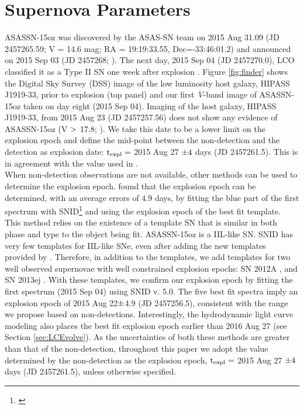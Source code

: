 \documentclass[a4paper,fleqn,usenatbib]{mnras}
\begin{document}
\section{Supernova Parameters} \label{15ozIntro}
ASASSN-15oz was discovered by the ASAS-SN team on 2015 Aug 31.09 (JD 2457265.59; V = 14.6 mag; RA = 19:19:33.55, Dec=-33:46:01.2) and announced on 2015 Sep 03 (JD 2457268; \citealt{2015brown}). 
The next day, 2015 Sep 04 (JD 2457270.0), LCO classified it as a Type II SN one week after explosion \citep{2015hosseinzadeh}. 
Figure \ref{fig:finder} shows the Digital Sky Survey (DSS) image of the low luminosity host galaxy, HIPASS J1919-33, prior to explosion (top panel) and our first {\it V}-band image of ASASSN-15oz taken on day eight (2015 Sep 04).
Imaging of the host galaxy, HIPASS J1919-33, from 2015 Aug 23 (JD 2457257.56) does not show any evidence of ASASSN-15oz (V $\rm{>}$ 17.8; \citealt{2015brown}). 
We take this date to be a lower limit on the explosion epoch and define the mid-point between the non-detection and the detection as explosion date: $\rm{t_{expl} =}$ 2015 Aug 27 $\rm{\pm 4}$ days (JD 2457261.5). 
This is in agreement with the value used in \citet{2018gutierrez}.\\
\indent When non-detection observations are not available, other methods can be used to determine the explosion epoch. 
\citet{2017gutierrez} found that the explosion epoch can be determined, with an average errors of 4.9 days, by fitting the blue part of the first spectrum with SNID\footnote{\citet{2011blondin}} 
\citep{2007blondin} and using the explosion epoch of the best fit template.
This method relies on the existence of a template SN that is similar in both phase and type to the object being fit.
ASASSN-15oz is a IIL-like SN. 
SNID has very few templates for IIL-like SNe, even after adding the new templates provided by \citet{2017gutierrez}. 
Therefore, in addition to the \citet{2017gutierrez} templates, we add templates for two well observed supernovae with well constrained explosion epochs: SN 2012A \citep{2013tomasella}, and SN 2013ej \citep{2016childress,2016dhungana,2014valenti,2015smartt}.
With these templates, we confirm our explosion epoch by fitting the first spectrum (2015 Sep 04) using SNID v. 5.0.
The five best fit spectra imply an explosion epoch of  2015 Aug 22$\rm{\pm}$4.9 (JD 2457256.5), consistent with the range we propose based on non-detections.
Interestingly, the hydrodynamic light curve modeling also places the best fit explosion epoch earlier than 2016 Aug 27 (see Section \ref{sec:LCEvolve}).
As the uncertainties of both these methods are greater than that of the non-detection, throughout this paper we adopt the value determined by the non-detection as the explosion epoch, $\rm{t_{expl} =}$ 2015 Aug 27 $\rm{\pm 4}$ days (JD 2457261.5), unless otherwise specified.
\end{document}
